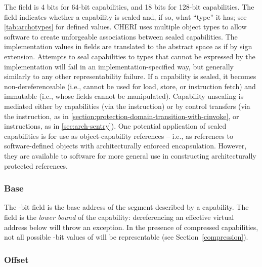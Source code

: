 The \cotype{} field is 4 bits for 64-bit capabilities, and 18 bits for 128-bit
capabilities.
The field indicates whether a capability is sealed and, if so,
what ``type'' it has; see \cref{tab:archotypes} for defined values.
CHERI uses multiple object types to allow software to create unforgeable
associations between sealed capabilities.
The implementation values in \cotype{} fields are translated to the abstract
space as if by sign extension.  Attempts to seal capabilities to types that
cannot be expressed by the implementation will fail in an
implementation-specified way, but generally similarly to any other
representability failure.
%
If a capability is sealed, it becomes non-dereferenceable (i.e., cannot be used
for load, store, or instruction fetch) and immutable (i.e., whose fields cannot
be manipulated).  Capability unsealing is mediated either by capabilities (via
the  instruction) or by control transfers (via
the  instruction, as in
\cref{section:protection-domain-transition-with-cinvoke}, or
 instructions, as in \cref{sec:arch-sentry}).
%
One potential application of sealed capabilities is for use as
object-capability references -- i.e., as references to software-defined objects
with architecturally enforced encapsulation.  However, they are available to
software for more general use in constructing architecturally protected
references.


\subsubsection{Base}

The \xlen{}-bit \cbase{} field is the base address of the segment described
by a capability.
The \cbase{} field is the \textit{lower bound} of the capability:
dereferencing an effective virtual address below \cbase{} will throw an
exception.
In the presence of compressed capabilities, not all possible \xlen{}-bit
values of
\cbase{} will be representable (see Section~\ref{compression}).

\subsubsection{Offset}

